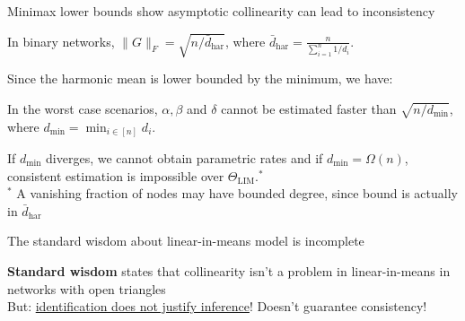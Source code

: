\documentclass[aspectratio=169]{beamer}
\theoremstyle{remark}
\begin{document}
\begin{frame}{Minimax lower bounds show asymptotic collinearity can lead to inconsistency}
    
    In binary networks, $\| G \|_F = \sqrt{n/\bar{d}_{\text{har}}}$, where $\displaystyle \bar{d}_{\text{har}} = \frac{n}{\sum_{i=1}^n 1/d_i}$.
    
    \vspace{3mm}
    
    Since the harmonic mean is lower bounded by the minimum, we have:
    
    \vspace{2mm}
    
    \begin{theorem}[Intuitive]
        In the worst case scenarios, $\alpha, \beta$ and $\delta$ cannot be estimated faster than $\sqrt{n / d_{\min}}$, where $d_{\min} = \min_{i \in [n]} d_i$.
    \end{theorem}
    
    \vspace{2mm}
    
    If $d_{\min}$ diverges, we cannot obtain parametric rates and if $d_{\min} = \Omega(n)$, consistent estimation is impossible over $\Theta_\mathrm{LIM}$.$^*$ \\
    \vspace{4mm}
    \footnotesize$^*$ A vanishing fraction of nodes may have bounded degree, since bound is actually in $\bar{d}_{\text{har}}$
    
\end{frame}



\begin{frame}{The standard wisdom about linear-in-means model is incomplete}
    
    \textbf{Standard wisdom} states that collinearity isn't a problem in linear-in-means in networks with open triangles \citep{bramoulle2009} \\
    
    \vspace{4mm}
    But: \underline{identification does not justify inference}! Doesn't guarantee consistency! \\
    
\end{frame}



\end{document}

